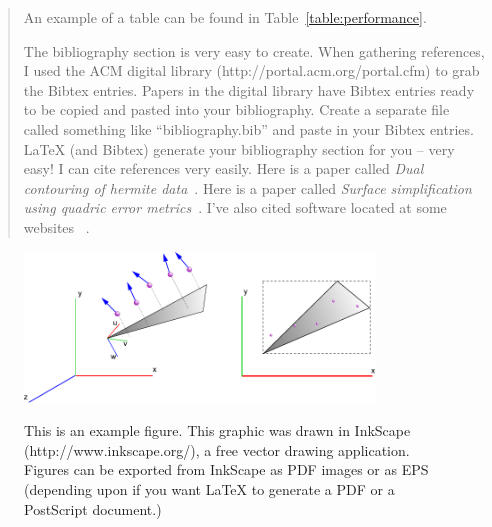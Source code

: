 \documentclass[12pt]{ucthesis}
\newcommand{\captionfonts}{\small\bf\ssp}
\begin{document}
\begin{frontmatter}
\begin{abstract}
An example of a table can be found in Table~\ref{table:performance}.

The bibliography section is very easy to create.  When gathering references, I used the ACM digital library (http://portal.acm.org/portal.cfm) to grab the Bibtex entries.  Papers in the digital library have Bibtex entries ready to be copied and pasted into your bibliography.  Create a separate file called something like ``bibliography.bib'' and paste in your Bibtex entries.  LaTeX (and Bibtex) generate your bibliography section for you -- very easy! I can cite references very easily.  Here is a paper called \emph{Dual contouring of hermite data}~\cite{DualContouring}.  Here is a paper called \emph{Surface simplification using quadric error metrics}~\cite{QuadricErrorMetrics}.  I've also cited software located at some websites \cite{NormalMapper}~\cite{nVidiaMelody}.


\end{abstract}





\tableofcontents


\listoftables

\listoffigures

\end{frontmatter}

\pagestyle{plain}




\renewcommand{\baselinestretch}{1.66}








\begin{figure}
\begin{center}
\includegraphics[height=40mm]{example_figure.pdf}
\captionfonts
\caption[This is a figure]{This is an example figure.  This graphic was drawn in InkScape (http://www.inkscape.org/), a free vector drawing application.  Figures can be exported from InkScape as PDF images or as EPS (depending upon if you want LaTeX to generate a PDF or a PostScript document.)}
\label{fig:inkscape-example}
\end{center}
\end{figure}
\end{document}
